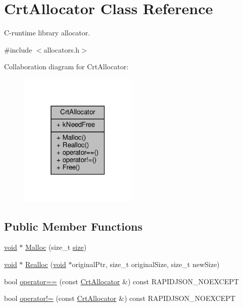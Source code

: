 \hypertarget{classCrtAllocator}{}\section{Crt\+Allocator Class Reference}
\label{classCrtAllocator}


C-\/runtime library allocator.  




{\ttfamily \#include $<$allocators.\+h$>$}



Collaboration diagram for Crt\+Allocator\+:
\nopagebreak
\begin{figure}[H]
\begin{center}
\leavevmode
\includegraphics[width=159pt]{classCrtAllocator__coll__graph}
\end{center}
\end{figure}
\subsection*{Public Member Functions}
\begin{DoxyCompactItemize}
\item 
\hyperlink{imgui__impl__opengl3__loader_8h_ac668e7cffd9e2e9cfee428b9b2f34fa7}{void} $\ast$ \hyperlink{classCrtAllocator_acd720631f8c094041afa6c7951f0d935}{Malloc} (size\+\_\+t \hyperlink{imgui__impl__opengl3__loader_8h_a3d1e3edfcf61ca2d831883e1afbad89e}{size})
\item 
\hyperlink{imgui__impl__opengl3__loader_8h_ac668e7cffd9e2e9cfee428b9b2f34fa7}{void} $\ast$ \hyperlink{classCrtAllocator_a646bb6f68afe773a62a22f7f14f83e97}{Realloc} (\hyperlink{imgui__impl__opengl3__loader_8h_ac668e7cffd9e2e9cfee428b9b2f34fa7}{void} $\ast$original\+Ptr, size\+\_\+t original\+Size, size\+\_\+t new\+Size)
\item 
bool \hyperlink{classCrtAllocator_ae65fb1b4e1272d05e003be57feac68a6}{operator==} (const \hyperlink{classCrtAllocator}{Crt\+Allocator} \&) const R\+A\+P\+I\+D\+J\+S\+O\+N\+\_\+\+N\+O\+E\+X\+C\+E\+PT
\item 
bool \hyperlink{classCrtAllocator_a1fb8ca99a43c939595e5c0b548d7532c}{operator!=} (const \hyperlink{classCrtAllocator}{Crt\+Allocator} \&) const R\+A\+P\+I\+D\+J\+S\+O\+N\+\_\+\+N\+O\+E\+X\+C\+E\+PT
\end{DoxyCompactItemize}
